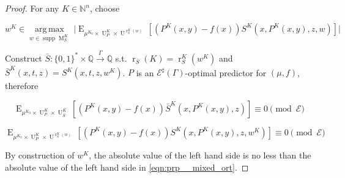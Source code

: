 \documentclass{article}
\numberwithin{equation}{section}
\theoremstyle{definition}
\theoremstyle{plain}
\newcommand{\Bool}{\{0,1\}}
\newcommand{\Words}{{\Bool^*}}
\DeclareMathOperator{\Supp}{supp}
\DeclareMathOperator{\E}{E}
\DeclareMathOperator{\R}{r}
\DeclareMathOperator{\M}{M}
\DeclareMathOperator{\Un}{U}
\newcommand{\Argmax}[1]{\underset{#1}{\operatorname{arg\,max}}\,}
\newcommand{\Nats}{\mathbb{N}}
\newcommand{\Rats}{\mathbb{Q}}
\newcommand{\Abs}[1]{\lvert #1 \rvert}
\newcommand{\Fall}{\mathcal{E}}
\newcommand{\ESG}{\Fall^\sharp(\Gamma)}
\newcommand{\Scheme}{\xrightarrow{\Gamma}}
\begin{document}
\begin{proof}

For any $K \in \Nats^n$, choose 

$$w^{K} \in \Argmax{w \in \Supp \M_S^{K}} \Abs{\E_{\mu^{K_0} \times \Un_P^{K} \times \Un^{\R_S^{K}(w)}}[(P^{K}(x,y) - f(x))S^{K}(x,P^{K}(x,y),z,w)]}$$

Construct $\bar{S}: \Words \times \Rats \Scheme \Rats$ s.t. $\R_{\bar{S}}(K)=\R_S^{K}(w^{K})$ and ${\bar{S}^{K}(x,t,z)=S^{K}(x,t,z,w^{K})}$. $P$ is an $\ESG$-optimal predictor for $(\mu,f)$, therefore

$$\E_{\mu^{K_0} \times \Un_P^{K} \times \Un_{\bar{S}}^{K}}[(P^{K}(x,y) - f(x))\bar{S}^{K}(x,P^{K}(x,y),z)] \equiv 0 \pmod \Fall$$

$$\E_{\mu^{K_0} \times \Un_P^{K} \times \Un^{\R_S^{K}(w)}}[(P^{K}(x,y) - f(x))S^{K}(x,P^{K}(x,y),z,w^{K})] \equiv 0 \pmod \Fall$$

By construction of $w^{K}$, the absolute value of the left hand side is no less than the absolute value of the left hand side in \ref{eqn:prp__mixed_ort}.
\end{proof}
\end{document}
